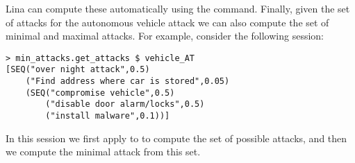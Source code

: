 Lina can compute these automatically using the 
command.  Finally, given the set of attacks for the autonomous vehicle
attack we can also compute the set of minimal and maximal attacks.
For example, consider the following session:
\begin{mdframed}
  \scriptsize
  \begin{verbatim}
> min_attacks.get_attacks $ vehicle_AT
[SEQ("over night attack",0.5)
	("Find address where car is stored",0.05)
	(SEQ("compromise vehicle",0.5)
		("disable door alarm/locks",0.5)
		("install malware",0.1))]
  \end{verbatim}
\end{mdframed}

In this session we first apply  to  to
compute the set of possible attacks, and then we compute the minimal
attack from this set.

